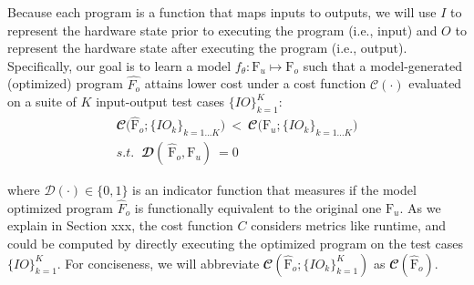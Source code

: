 \documentclass{article}
\newcommand\p{\ensuremath{{\mathrm{F}_u}}}
\begin{document}
Because each program is a function that maps inputs to outputs, we will use $I$ to represent the hardware state prior to executing the program (i.e., input) and $O$ to represent the hardware state after executing the program (i.e., output).
Specifically, our goal is to learn a   model $f_{\theta}: \text{F}_u \mapsto \text{F}_o$ such that a model-generated (optimized) program $\hat{F_o}$ attains lower cost under a cost function $\mathcal{C}(\cdot)$ evaluated on a suite of $K$ input-output test cases $\{ IO \}_{k=1}^K$:
\begin{equation}
    \label{eqn:optimizaiton_goal}
    \begin{split}
        \mathbfcal{C} \Big(\hat{\textrm{F}}_{o}; \{IO_k\}_{k=1...K} \Big)  \ 
        < \ 
        \mathbfcal{C} \Big(\textrm{F}_{u}; \{IO_k\}_{k=1...K}\Big) \\
         s.t. \;\; \mathbfcal{D}( \ 
                        \hat{\textrm{F}}_{o}, \textrm{F}_{u} ) \ 
                        = 0  %
    \end{split}
\end{equation}

where $\mathcal{D}(\cdot) \in \{ 0, 1 \}$ is an indicator function that measures if the model optimized program $\hat{F}_o$ is functionally equivalent to the original one $\p$. 
As we explain in Section xxx, the cost function $C$ considers metrics like runtime, and could be computed by directly executing the optimized program on the test cases $\{ IO \}_{k=1}^K$.
For conciseness, we will abbreviate $\mathbfcal{C} (\hat{\textrm{F}}_{o}; \{IO_k\}_{k=1}^K)$ as $\mathbfcal{C} (\hat{\textrm{F}}_{o})$. 
\end{document}
